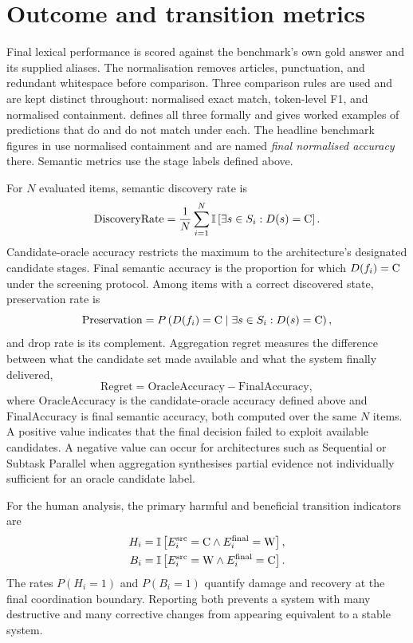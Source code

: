 \section{Outcome and transition metrics}

Final lexical performance is scored against the benchmark's own gold answer and its supplied aliases. The normalisation removes articles, punctuation, and redundant whitespace before comparison. Three comparison rules are used and are kept distinct throughout: normalised exact match, token-level F1, and normalised containment.  defines all three formally and  gives worked examples of predictions that do and do not match under each. The headline benchmark figures in  use normalised containment and are named \emph{final normalised accuracy} there. Semantic metrics use the stage labels defined above.

For $N$ evaluated items, semantic discovery rate is
\begin{equation}
  \mathrm{DiscoveryRate} = \frac{1}{N}\sum_{i=1}^{N} \mathbb{I}\left[\exists s \in S_i : D(s)=\mathrm{C}\right].
\end{equation}
Candidate-oracle accuracy restricts the maximum to the architecture's designated candidate stages. Final semantic accuracy is the proportion for which $D(f_i)=\mathrm{C}$ under the screening protocol. Among items with a correct discovered state, preservation rate is
\begin{equation}
  \mathrm{Preservation} = P\left(D(f_i)=\mathrm{C} \mid \exists s \in S_i : D(s)=\mathrm{C}\right),
\end{equation}
and drop rate is its complement. Aggregation regret measures the difference between what the candidate set made available and what the system finally delivered,
\begin{equation}
  \mathrm{Regret} = \mathrm{OracleAccuracy} - \mathrm{FinalAccuracy},
  \label{eq:regret}
\end{equation}
where $\mathrm{OracleAccuracy}$ is the candidate-oracle accuracy defined above and $\mathrm{FinalAccuracy}$ is final semantic accuracy, both computed over the same $N$ items. A positive value indicates that the final decision failed to exploit available candidates. A negative value can occur for architectures such as Sequential or Subtask Parallel when aggregation synthesises partial evidence not individually sufficient for an oracle candidate label.

For the human analysis, the primary harmful and beneficial transition indicators are
\begin{align}
  H_i &= \mathbb{I}\left[E_i^{\mathrm{src}}=\mathrm{C} \land E_i^{\mathrm{final}}=\mathrm{W}\right],\\
  B_i &= \mathbb{I}\left[E_i^{\mathrm{src}}=\mathrm{W} \land E_i^{\mathrm{final}}=\mathrm{C}\right].
\end{align}
The rates $P(H_i=1)$ and $P(B_i=1)$ quantify damage and recovery at the final coordination boundary. Reporting both prevents a system with many destructive and many corrective changes from appearing equivalent to a stable system.

